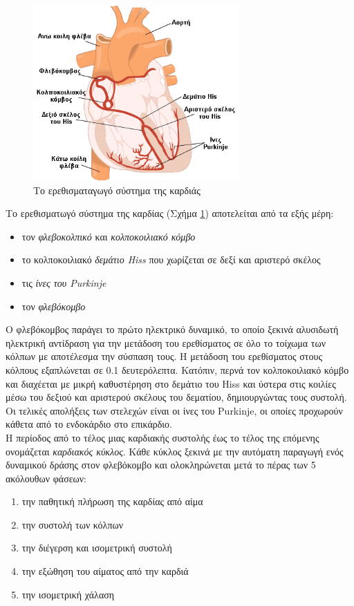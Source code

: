 \\[0.5 \baselineskip]
\begin{figure}[H]
    \centering
    \includegraphics[width=0.7\textwidth]{misc/stimulus.png}
    \caption{Το ερεθισματαγωγό σύστημα της καρδιάς}
    \label{fig:2.3}
\end{figure}
Το ερεθισματωγό σύστημα της καρδίας (Σχήμα \ref{fig:2.3}) αποτελείται από τα εξής μέρη:
\begin{itemize}
    \item τον \emph{φλεβοκολπικό} και \emph{κολποκοιλιακό κόμβο}
    \item το κολποκοιλιακό \emph{δεμάτιο \en Hiss \gr} που χωρίζεται σε δεξί και αριστερό σκέλος
    \item τις \emph{ίνες του \en Purkinje \gr}
    \item τον \emph{φλεβόκομβο}
\end{itemize}
Ο φλεβόκομβος παράγει το πρώτο ηλεκτρικό δυναμικό, το οποίο ξεκινά αλυσιδωτή ηλεκτρική αντίδραση για την μετάδοση του ερεθίσματος σε όλο το τοίχωμα των κόλπων με αποτέλεσμα την σύσπαση τους. Η μετάδοση του ερεθίσματος στους κόλπους εξαπλώνεται σε 0.1 δευτερόλεπτα. Κατόπιν, περνά τον κολποκοιλιακό κόμβο και διαχέεται με μικρή καθυστέρηση στο δεμάτιο του \en Hiss \gr και ύστερα στις κοιλίες μέσω του δεξιού και αριστερού σκέλους του δεματίου, δημιουργώντας τους συστολή. Οι τελικές απολήξεις των στελεχών είναι οι ίνες του \en Purkinje, \gr οι οποίες προχωρούν κάθετα από το ενδοκάρδιο στο επικάρδιο.
\\[0.5 \baselineskip]
Η περίοδος από το τέλος μιας καρδιακής συστολής έως το τέλος της επόμενης ονομάζεται \emph{καρδιακός κύκλος}. Κάθε κύκλος ξεκινά με την αυτόματη παραγωγή ενός δυναμικού δράσης στον φλεβόκομβο και ολοκληρώνεται μετά το πέρας των 5 ακόλουθων φάσεων:
\begin{enumerate}
    \item την παθητική πλήρωση της καρδίας από αίμα
    \item την συστολή των κόλπων
    \item την διέγερση και ισομετρική συστολή 
    \item την εξώθηση του αίματος από την καρδιά
    \item την ισομετρική χάλαση
\end{enumerate}
